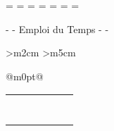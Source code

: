 
\ifpdf
{}
\fi



\pagestyle{fancy}


\paperwidth=\pdfpageheight
\paperheight=\pdfpagewidth
\pdfpageheight=\paperheight
\pdfpagewidth=\paperwidth
\headwidth=\textheight
\begingroup 
\vsize=\textwidth
\hsize=\textheight

\begin{center}
  {\large \institution{} - \dpt{} - Emploi du Temps - \semestre{} -
    \anneescolaire{}}
\end{center}
\begin{center}
  {\LARGE \bf \fulltitle{}}
\end{center}
  
\newcolumntype{D} { >{\centering\arraybackslash}m{2cm}}
\newcolumntype{H} { >{\vspace{-4ex}\centering\arraybackslash}m{5cm}}

\newcolumntype{X} {@{}m{0pt}@{}} %

\begin{center}
  \begin{tabular}{|D||H|H||H|H|X}\hline \rule{0pt}{0.8cm}
                & \hourone{}     & \hourtwo{}     & \hourthree{}     & \hourfour{}     &\tabularnewline \hline  \rule{0pt}{1.8cm}
    \lundi{}    & \lundione{}    & \lunditwo{}    & \lundithree{}    & \lundifour{}    &\tabularnewline \hline  \rule{0pt}{1.8cm}
    \mardi{}    & \mardione{}    & \marditwo{}    & \mardithree{}    & \mardifour{}    &\tabularnewline \hline  \rule{0pt}{1.8cm}
    \mercredi{} & \mercredione{} & \mercreditwo{} & \mercredithree{} & \mercredifour{} &\tabularnewline \hline  \rule{0pt}{1.8cm}
    \jeudi{}    & \jeudione{}    & \jeuditwo{}    & \jeudithree{}    & \jeudifour{}    &\tabularnewline \hline  \rule{0pt}{1.8cm}
    \vendredi{} & \vendredione{} & \vendreditwo{} & \vendredithree{} & \vendredifour{} &\tabularnewline \hline  \rule{0pt}{1.8cm}
    \samedi{}   & \samedione{}   & \sameditwo{}   & \samedithree{}   & \samedifour{}   &\tabularnewline[1cm]\hline
                                           &\tabularnewline\hline
  \end{tabular}
\end{center}

